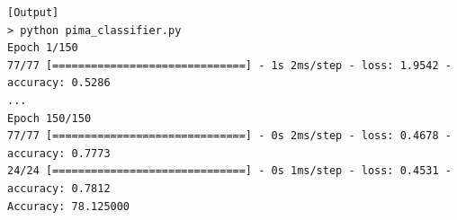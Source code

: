 \begin{Verbatim}[fontsize=\footnotesize, label=\makebox{\url{https://github.com/lucabaldini/cmepda/tree/master/slides/latex/snippets/pima_classifier.py}},commandchars=\\\{\}]
[Output]
> python pima_classifier.py
Epoch 1/150
77/77 [==============================] - 1s 2ms/step - loss: 1.9542 - accuracy: 0.5286
...
Epoch 150/150
77/77 [==============================] - 0s 2ms/step - loss: 0.4678 - accuracy: 0.7773
24/24 [==============================] - 0s 1ms/step - loss: 0.4531 - accuracy: 0.7812
Accuracy: 78.125000
\end{Verbatim}